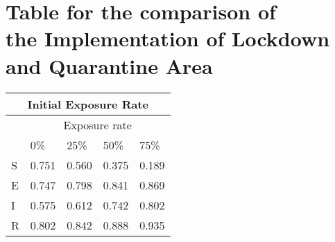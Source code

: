 \chapter{Table for the comparison of\\ the Implementation of Lockdown  \\and Quarantine Area}

\begin{center}
\begin{tabularx}{\textwidth}{|X|X|X|X|X|}
	\hline
	\multicolumn{5}{|c|}{Initial Exposure Rate} \\
	\hline
	& \multicolumn{4}{c|}{Exposure rate} \\
	\hline
	& 0\% & 25\% & 50\% & 75\% \\
	\hline
	S & 0.751 & 0.560 & 0.375 & 0.189 \\
	\hline
	E & 0.747 & 0.798 & 0.841 & 0.869 \\
	\hline
	I & 0.575 & 0.612 & 0.742 & 0.802 \\
	\hline
	R & 0.802 & 0.842 & 0.888 & 0.935 \\
	\hline
\end{tabularx}
\end{center}